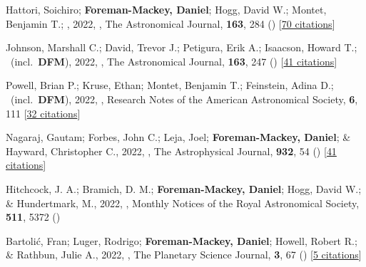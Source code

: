 \item[{\color{numcolor}\scriptsize82}] Hattori, Soichiro; \textbf{Foreman-Mackey, Daniel}; Hogg, David W.; Montet, Benjamin T.; \etal, 2022, , The Astronomical Journal, \textbf{163}, 284 () [\href{https://ui.adsabs.harvard.edu/abs/2022AJ....163..284H}{70 citations}]

\item[{\color{numcolor}\scriptsize81}] Johnson, Marshall C.; David, Trevor J.; Petigura, Erik A.; Isaacson, Howard T.; \etal\ (incl.\ \textbf{DFM}), 2022, , The Astronomical Journal, \textbf{163}, 247 () [\href{https://ui.adsabs.harvard.edu/abs/2022AJ....163..247J}{41 citations}]

\item[{\color{numcolor}\scriptsize80}] Powell, Brian P.; Kruse, Ethan; Montet, Benjamin T.; Feinstein, Adina D.; \etal\ (incl.\ \textbf{DFM}), 2022, , Research Notes of the American Astronomical Society, \textbf{6}, 111 [\href{https://ui.adsabs.harvard.edu/abs/2022RNAAS...6..111P}{32 citations}]

\item[{\color{numcolor}\scriptsize79}] Nagaraj, Gautam; Forbes, John C.; Leja, Joel; \textbf{Foreman-Mackey, Daniel}; \& Hayward, Christopher C., 2022, , The Astrophysical Journal, \textbf{932}, 54 () [\href{https://ui.adsabs.harvard.edu/abs/2022ApJ...932...54N}{41 citations}]

\item[{\color{numcolor}\scriptsize78}] Hitchcock, J. A.; Bramich, D. M.; \textbf{Foreman-Mackey, Daniel}; Hogg, David W.; \& Hundertmark, M., 2022, , Monthly Notices of the Royal Astronomical Society, \textbf{511}, 5372 ()

\item[{\color{numcolor}\scriptsize77}] Bartoli{\'c}, Fran; Luger, Rodrigo; \textbf{Foreman-Mackey, Daniel}; Howell, Robert R.; \& Rathbun, Julie A., 2022, , The Planetary Science Journal, \textbf{3}, 67 () [\href{https://ui.adsabs.harvard.edu/abs/2022PSJ.....3...67B}{5 citations}]

